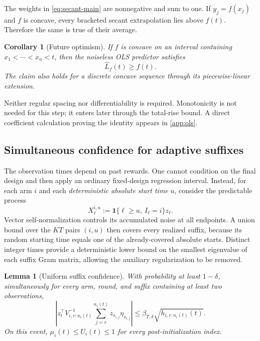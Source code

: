 \documentclass[11pt]{article}
\newtheorem{lemma}[lemma]{Lemma}
\newtheorem{corollary}[corollary]{Corollary}
\theoremstyle{remark}
\newcommand{\ind}{\mathbf 1}
\begin{document}
The weights in \eqref{eq:secant-main} are nonnegative and sum to one. If $y_j=f(x_j)$ and $f$ is concave, every bracketed secant extrapolation lies above $f(t)$. Therefore the same is true of their average.

\begin{samepage}
\begin{corollary}[Future optimism]\label{cor:optimism-main}
If $f$ is concave on an interval containing $x_1<\cdots<x_n<t$, then the noiseless OLS predictor satisfies
\[
\widehat L_f(t)\ge f(t).
\]
The claim also holds for a discrete concave sequence through its piecewise-linear extension.
\end{corollary}
\end{samepage}

Neither regular spacing nor differentiability is required. Monotonicity is not needed for this step; it enters later through the total-rise bound. A direct coefficient calculation proving the identity appears in \cref{app:ols}.

\subsection{Simultaneous confidence for adaptive suffixes}

The observation times depend on past rewards. One cannot condition on the final design and then apply an ordinary fixed-design regression interval. Instead, for each arm $i$ and each \emph{deterministic absolute start time} $u$, consider the predictable process
\[
X_\ell^{i,u}:=\ind\{\ell\ge u,\ I_\ell=i\}z_\ell.
\]
Vector self-normalization \citep{abbasi2011improved} controls its accumulated noise at all endpoints. A union bound over the $KT$ pairs $(i,u)$ then covers every realized suffix, because its random starting time equals one of the already-covered absolute starts. Distinct integer times provide a deterministic lower bound on the smallest eigenvalue of each suffix Gram matrix, allowing the auxiliary regularization to be removed.

\begin{samepage}
\begin{lemma}[Uniform suffix confidence]\label{lem:confidence-main}
With probability at least $1-\delta$, simultaneously for every arm, round, and suffix containing at least two observations,
\begin{equation}\label{eq:confidence-main}
\left|z_t^\top V_{i,r:n_i(t)}^{-1}
\sum_{j=r}^{n_i(t)}z_{s_{i,j}}\eta_{s_{i,j}}\right|
\le\beta_{T,\delta}\sqrt{h_{i,r:n_i(t)}(t)}.
\end{equation}
On this event, $\mu_i(t)\le U_i(t)\le1$ for every post-initialization index.
\end{lemma}
\end{samepage}
\end{document}
